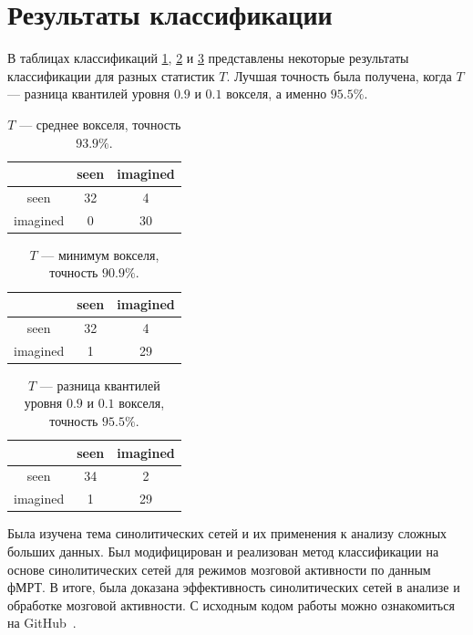 \documentclass[specialist,
substylefile = spbu_report.rtx,
subf,href,colorlinks=true, 12pt]{disser}
\begin{document}
		\section{Результаты классификации}
			В таблицах классификаций \ref{tb:2}, \ref{tb:3} и \ref{tb:4} представлены некоторые результаты классификации для разных статистик $T$. Лучшая точность была получена, когда $T$ --- разница квантилей уровня $0.9$ и $0.1$ вокселя, а именно $95.5\%$.
						
			\begin{table}[H]				
				\centering			
				\begin{tabular}{c|cc}
					& \multicolumn{1}{c|}{seen} & imagined \\ \hline
					seen     & 32                        & 4        \\ \cline{1-1}
					imagined & 0                         & 30      
				\end{tabular}
				\caption{\label{tb:2}$T$ --- среднее вокселя, точность $93.9\%$.}
			\end{table}			
			{
			\begin{table}[H]
				\centering				
				\begin{tabular}{c|cc}
					& \multicolumn{1}{c|}{seen} & imagined \\ \hline
					seen     & 32                        & 4        \\ \cline{1-1}
					imagined & 1                         & 29      
				\end{tabular}
				\caption{\label{tb:3}$T$ --- минимум вокселя, точность $90.9\%$.}
			\end{table}
			
			\begin{table}[H]
				\centering
				\begin{tabular}{c|cc}
					& \multicolumn{1}{c|}{seen} & imagined \\ \hline
					seen     & 34                        & 2        \\ \cline{1-1}
					imagined & 1                         & 29      
				\end{tabular}
				\caption{\label{tb:4}$T$ --- разница квантилей уровня $0.9$ и $0.1$ вокселя, точность $95.5\%$.}
			\end{table}
			}
	\conclusion
		Была изучена тема синолитических сетей и их применения к анализу сложных больших данных. Был модифицирован и реализован метод классификации на основе синолитических сетей для режимов мозговой активности по данным фМРТ. В итоге, была доказана эффективность синолитических сетей в анализе и обработке мозговой активности. С исходным кодом работы можно ознакомиться на GitHub~\cite{Vlasenko2023}.
	   
	
	
	
	
	
\end{document}
